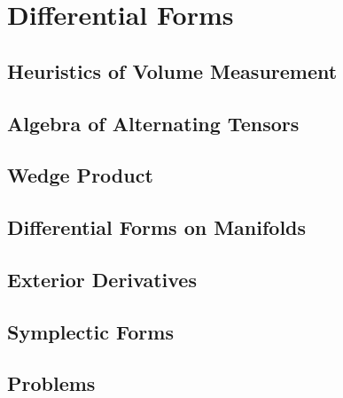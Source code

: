 \chapter{Differential Forms}
\section{Heuristics of Volume Measurement}
\section{Algebra of Alternating Tensors}
\section{Wedge Product}
\section{Differential Forms on Manifolds}
\section{Exterior Derivatives}
\section{Symplectic Forms}
\section{Problems}
